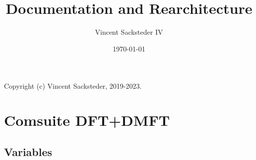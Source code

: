 \documentclass[aps,prb,singlecolumn,preprintnumbers,amsmath,amssymb]{revtex4}
\begin{document}
\title{Documentation and Rearchitecture}

\author{Vincent Sacksteder IV}


\date{\today}%

\maketitle 

Copyright (c) Vincent Sacksteder, 2019-2023.


\section{Comsuite DFT+DMFT}

\subsection{Variables}
\end{document}
